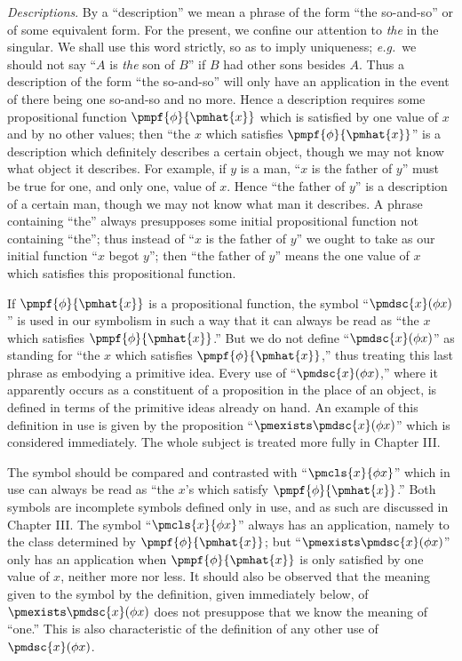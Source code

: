 \documentclass[letterpaper,12pt,openany,leqno]{book}
\begin{document}
\textit{Descriptions}. By a ``description'' we mean a phrase of the form ``the so-and-so'' or of some equivalent form. For the present, we confine our attention to \textit{the} in the singular. We shall use this word strictly, so as to imply uniqueness; \textit{e.g.}\ we should not say ``$A$ is \textit{the} son of $B$'' if $B$ had other sons besides $A$. Thus a description of the form ``the so-and-so'' will only have an application in the event of there being one so-and-so and no more. Hence a description requires some propositional function $\pmpf{\phi}{\pmhat{x}}$ which is satisfied by one value of $x$ and by no other values; then ``the $x$ which satisfies $\pmpf{\phi}{\pmhat{x}}$'' is a description which definitely describes a certain object, though we may not know what object it describes. For example, if $y$ is a man, ``$x$ is the father of $y$'' must be true for one, and only one, value of $x$. Hence ``the father of $y$'' is a description of a certain man, though we may not know what man it describes. A phrase containing ``the'' always presupposes some initial propositional function not containing ``the''; thus instead of ``$x$ is the father of $y$'' we ought to take as our initial function ``$x$ begot $y$''; then ``the father of $y$'' means the one value of $x$ which satisfies this propositional function.

If $\pmpf{\phi}{\pmhat{x}}$ is a propositional function, the symbol ``$\pmdsc{x}(\phi x)$'' is used in our symbolism in such a way that it can always be read as ``the $x$ which satisfies $\pmpf{\phi}{\pmhat{x}}$.'' But we do not define ``$\pmdsc{x}(\phi x)$'' as standing for ``the $x$ which satisfies $\pmpf{\phi}{\pmhat{x}}$,'' thus treating this last phrase as embodying a primitive idea. Every use of ``$\pmdsc{x}(\phi x)$,'' where it apparently occurs as a constituent of a proposition in the place of an object, is defined in terms of the primitive ideas already on hand. An example of this definition in use is given by the proposition ``$\pmexists\pmdsc{x}(\phi x)$'' which is considered immediately. The whole subject is treated more fully in Chapter III.

The symbol should be compared and contrasted with ``$\pmcls{x}{\phi x}$'' which in use can always be read as ``the $x$'s which satisfy $\pmpf{\phi}{\pmhat{x}}$.'' Both symbols are incomplete symbols defined only in use, and as such are discussed in Chapter III. The symbol ``$\pmcls{x}{\phi x}$'' always has an application, namely to the class determined by $\pmpf{\phi}{\pmhat{x}}$; but ``$\pmexists\pmdsc{x}(\phi x)$'' only has an application when $\pmpf{\phi}{\pmhat{x}}$ is only satisfied by one value of $x$, neither more nor less. It should also be observed that the meaning given to the symbol by the definition, given immediately below, of $\pmexists\pmdsc{x}(\phi x)$ does not presuppose that we know the meaning of ``one.'' This is also characteristic of the definition of any other use of $\pmdsc{x}(\phi x)$.
\end{document}
